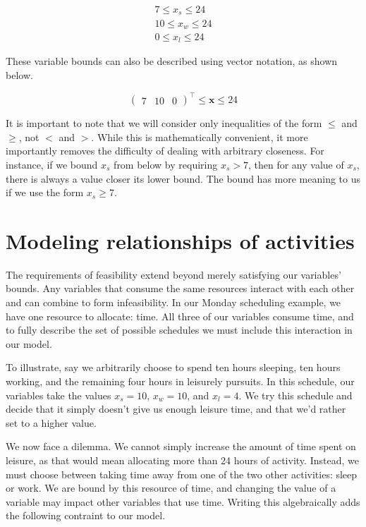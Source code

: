 $$
\begin{aligned}
	7  \le x_s \le 24 \\
	10 \le x_w \le 24 \\
	0  \le x_l \le 24
\end{aligned}
$$

These variable bounds can also be described using vector notation, as shown below.

$$
\begin{pmatrix}
	7 & 10 & 0
\end{pmatrix}^\intercal \le \mathbf{x} \le 24
$$

It is important to note that we will consider only inequalities of the form $\le$ and $\ge$, not $<$ and $>$. While this is mathematically convenient, it more importantly removes the difficulty of dealing with arbitrary closeness. For instance, if we bound $x_s$ from below by requiring $x_s > 7$, then for any value of $x_s$, there is always a value closer its lower bound. The bound has more meaning to us if we use the form $x_s \ge 7$.


\section{Modeling relationships of activities}

The requirements of feasibility extend beyond merely satisfying our variables' bounds. Any variables that consume the same resources interact with each other and can combine to form infeasibility. In our Monday scheduling example, we have one resource to allocate: time. All three of our variables consume time, and to fully describe the set of possible schedules we must include this interaction in our model.

To illustrate, say we arbitrarily choose to spend ten hours sleeping, ten hours working, and the remaining four hours in leisurely pursuits. In this schedule, our variables take the values $x_s = 10$, $x_w = 10$, and $x_l = 4$. We try this schedule and decide that it simply doesn't give us enough leisure time, and that we'd rather set  to a higher value.

We now face a dilemma. We cannot simply increase the amount of time spent on leisure, as that would mean allocating more than 24 hours of activity. Instead, we must choose between taking time away from one of the two other activities: sleep or work. We are bound by this resource of time, and changing the value of a variable may impact other variables that use time. Writing this algebraically adds the following contraint to our model.

